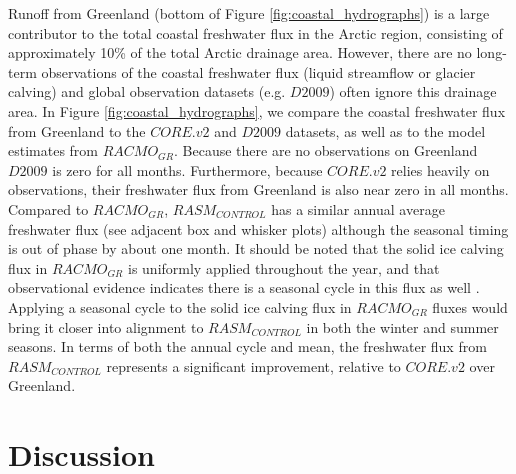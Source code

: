 \documentclass[jgrga, draft]{agutex}
\begin{document}
\begin{article}
Runoff from Greenland (bottom of Figure \ref{fig:coastal_hydrographs}) is a large contributor to the total coastal freshwater flux in the Arctic region, consisting of approximately 10\% of the total Arctic drainage area.
However, there are no long-term observations of the coastal freshwater flux (liquid streamflow or glacier calving) and global observation datasets (e.g. $D2009$) often ignore this drainage area.
In Figure \ref{fig:coastal_hydrographs}, we compare the coastal freshwater flux from Greenland to the $CORE.v2$ and $D2009$ datasets, as well as to the model estimates from $RACMO_{GR}$.
Because there are no observations on Greenland $D2009$ is zero for all months.
Furthermore, because $CORE.v2$ relies heavily on observations, their freshwater flux from Greenland is also near zero in all months.
Compared to $RACMO_{GR}$, $RASM_{CONTROL}$ has a similar annual average freshwater flux (see adjacent box and whisker plots) although the seasonal timing is out of phase by about one month.
It should be noted that the solid ice calving flux in $RACMO_{GR}$ is uniformly applied throughout the year, and that observational evidence indicates there is a seasonal cycle in this flux as well \citep[e.g.][]{Joughin_2008}.
Applying a seasonal cycle to the solid ice calving flux in $RACMO_{GR}$ fluxes would bring it closer into alignment to $RASM_{CONTROL}$ in both the winter and summer seasons.
In terms of both the annual cycle and mean, the freshwater flux from $RASM_{CONTROL}$ represents a significant improvement, relative to $CORE.v2$ over Greenland.

\section{Discussion}
\label{sec:discussion}


\end{article}
\end{document}
